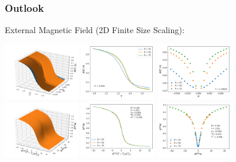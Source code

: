 \documentclass{beamer}
\begin{document}
\begin{frame}
	\frametitle{Outlook}
	External Magnetic Field (2D Finite Size Scaling): \vspace{2mm}

	\includegraphics[width=3.3cm]{Images/2dFSS/3dunscaled} \hspace{1mm}
	\includegraphics[width=3.3cm]{Images/2dFSS/magtemp} \hspace{1mm}
	\includegraphics[width=3.3cm]{Images/2dFSS/magfield} \\ \vspace{1mm}
	\includegraphics[width=3.3cm]{Images/2dFSS/3dscaled} \hspace{1mm}
	\includegraphics[width=3.3cm]{Images/2dFSS/scaledmagtemp} \hspace{1mm}
	\includegraphics[width=3.3cm]{Images/2dFSS/scaledmagfield}
\end{frame}
\end{document}
